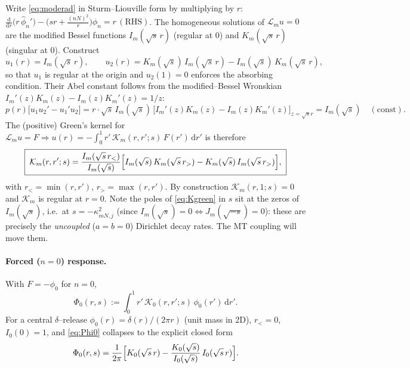 \documentclass{article}
\newcommand{\rd}{\mathrm{d}}
\newcommand{\Lap}{\mathcal{L}}
\begin{document}
Write \eqref{eq:moderad} in Sturm--Liouville form by multiplying by $r$:
$\frac{\rd}{\rd r}\!\bigl(r\,\widehat\phi_n'\bigr)-\bigl(sr+\tfrac{(nN)^2}{r}\bigr)\widehat\phi_n=r\,(\text{RHS})$.
The homogeneous solutions of $\Lap_m u=0$ are the modified Bessel functions
$I_m(\sqrt s\,r)$ (regular at $0$) and $K_m(\sqrt s\,r)$ (singular at $0$).
Construct
\begin{equation}
u_1(r)=I_m(\sqrt s\,r),\qquad
u_2(r)=K_m(\sqrt s)\,I_m(\sqrt s\,r)-I_m(\sqrt s)\,K_m(\sqrt s\,r),
\end{equation}
so that $u_1$ is regular at the origin and $u_2(1)=0$ enforces the absorbing
condition. Their Abel constant follows from the modified--Bessel Wronskian
$I_m'(z)K_m(z)-I_m(z)K_m'(z)=1/z$:
\begin{equation}
p(r)\bigl[u_1u_2'-u_1'u_2\bigr]
=r\cdot\sqrt s\,I_m(\sqrt s)\,
\bigl[I_m'(z)K_m(z)-I_m(z)K_m'(z)\bigr]_{z=\sqrt s r}
=I_m(\sqrt s)\quad(\text{const}).
\end{equation}
The (positive) Green's kernel for $\Lap_m u=F\Rightarrow u(r)=-\int_0^1 r'\,\mathcal K_m(r,r';s)\,F(r')\,\rd r'$ is therefore
\begin{equation}
\boxed{\;
\mathcal K_m(r,r';s)=
\frac{I_m(\sqrt s\,r_<)}{I_m(\sqrt s)}
\Bigl[I_m(\sqrt s)\,K_m(\sqrt s\,r_>)-K_m(\sqrt s)\,I_m(\sqrt s\,r_>)\Bigr],
\;}
\label{eq:Kgreen}
\end{equation}
with $r_<=\min(r,r')$, $r_>=\max(r,r')$. By construction $\mathcal K_m(r,1;s)=0$
and $\mathcal K_m$ is regular at $r=0$. Note the poles of \eqref{eq:Kgreen} in $s$
sit at the zeros of $I_m(\sqrt s)$, i.e.\ at $s=-\kappa_{mN,j}^2$ (since
$I_m(\sqrt s)=0\Leftrightarrow J_m(\sqrt{-s})=0$): these are precisely the
\emph{uncoupled} ($a=b=0$) Dirichlet decay rates. The MT coupling will move them.

\paragraph{Forced ($n=0$) response.} With $F=-\phi_0$ for $n=0$,
\begin{equation}
\Phi_0(r,s):=\int_0^1 r'\,\mathcal K_0(r,r';s)\,\phi_0(r')\,\rd r' .
\label{eq:Phi0}
\end{equation}
For a central $\delta$--release $\phi_0(r)=\delta(r)/(2\pi r)$ (unit mass in 2D),
$r_<=0$, $I_0(0)=1$, and \eqref{eq:Phi0} collapses to the explicit closed form
\begin{equation}
\Phi_0(r,s)=\frac{1}{2\pi}
\Bigl[K_0(\sqrt s\,r)-\frac{K_0(\sqrt s)}{I_0(\sqrt s)}\,I_0(\sqrt s\,r)\Bigr].
\label{eq:Phi0delta}
\end{equation}
\end{document}
